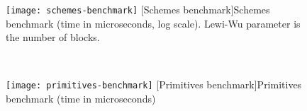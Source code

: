 \begin{figure}[!ht]
	\centering
	\begin{minipage}[t]{0.48\columnwidth}
		\centering
		\texttt{[image: schemes-benchmark]}
		[Schemes benchmark]{Schemes benchmark (time in microseconds, log scale). Lewi-Wu parameter is the number of blocks.}%
		\label{figure:benchmarks:schemes}
	\end{minipage}
	~ %
	\begin{minipage}[t]{0.48\columnwidth}
		\centering
		\texttt{[image: primitives-benchmark]}
		[Primitives benchmark]{Primitives benchmark (time in microseconds)}%
		\label{figure:benchmarks:primitives}
	\end{minipage}
\end{figure}

